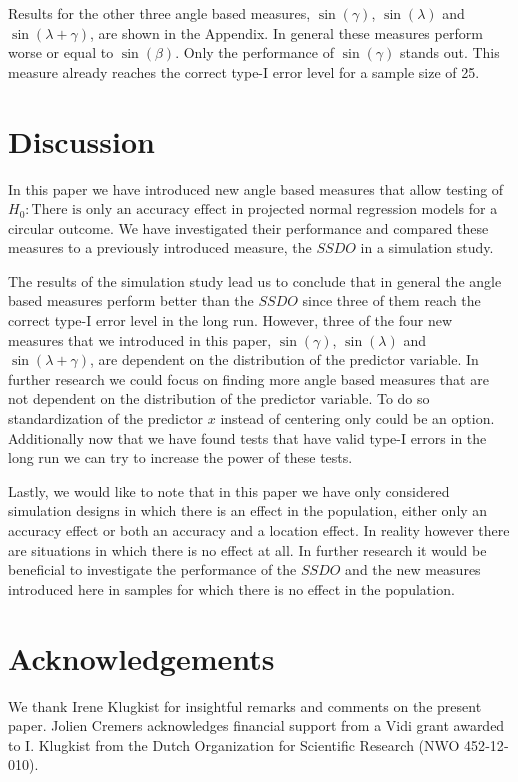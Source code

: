 \documentclass[11pt,]{article}
\begin{document}
Results for the other three angle based measures, \(\sin(\gamma)\),
\(\sin(\lambda)\) and \(\sin(\lambda + \gamma)\), are shown in the
Appendix. In general these measures perform worse or equal to
\(\sin(\beta)\). Only the performance of \(\sin(\gamma)\) stands out.
This measure already reaches the correct type-I error level for a sample
size of 25.

\section{Discussion}

In this paper we have introduced new angle based measures that allow
testing of \textit{$H_0: \text{There is only an accuracy effect}$} in
projected normal regression models for a circular outcome. We have
investigated their performance and compared these measures to a
previously introduced measure, the \(SSDO\) in a simulation study.

The results of the simulation study lead us to conclude that in general
the angle based measures perform better than the \(SSDO\) since three of
them reach the correct type-I error level in the long run. However,
three of the four new measures that we introduced in this paper,
\(\sin(\gamma)\), \(\sin(\lambda)\) and \(\sin(\lambda + \gamma)\), are
dependent on the distribution of the predictor variable. In further
research we could focus on finding more angle based measures that are
not dependent on the distribution of the predictor variable. To do so
standardization of the predictor \(x\) instead of centering only could
be an option. Additionally now that we have found tests that have valid
type-I errors in the long run we can try to increase the power of these
tests.

Lastly, we would like to note that in this paper we have only considered
simulation designs in which there is an effect in the population, either
only an accuracy effect or both an accuracy and a location effect. In
reality however there are situations in which there is no effect at all.
In further research it would be beneficial to investigate the
performance of the \(SSDO\) and the new measures introduced here in
samples for which there is no effect in the population.

\section*{Acknowledgements}

We thank Irene Klugkist for insightful remarks and comments on the
present paper. Jolien Cremers acknowledges financial support from a Vidi
grant awarded to I. Klugkist from the Dutch Organization for Scientific
Research (NWO 452‐12‐010).
\end{document}
